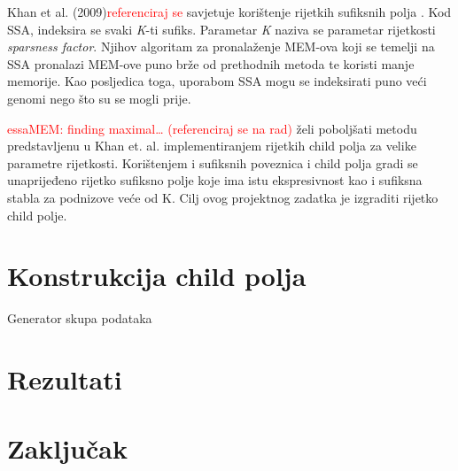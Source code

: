 \documentclass[times, utf8, seminar, numeric]{fer}
\newcommand\todo[1]{\textcolor{red}{#1}}
\begin{document}
Khan et al. (2009)\todo{referenciraj se} savjetuje korištenje rijetkih sufiksnih polja . Kod SSA, indeksira se svaki \textit{K}-ti sufiks. Parametar \textit{K} naziva se parametar rijetkosti \textit{sparsness factor}. Njihov algoritam za pronalaženje MEM-ova koji se temelji na SSA pronalazi MEM-ove puno brže od prethodnih metoda te koristi manje memorije. Kao posljedica toga, uporabom SSA mogu se indeksirati puno veći genomi nego što su se mogli prije.

\todo{essaMEM: finding maximal… (referenciraj se na rad)} želi poboljšati metodu predstavljenu u Khan et. al. implementiranjem rijetkih child polja za velike parametre rijetkosti. Korištenjem i sufiksnih poveznica  i child polja gradi se unaprijeđeno rijetko sufiksno polje  koje ima istu ekspresivnost kao i sufiksna stabla za podnizove veće od K. Cilj ovog projektnog zadatka je izgraditi rijetko child polje.

\chapter{Konstrukcija child polja}

\begin{algorithm}[h]
	\caption{Generator skupa podataka}
	\label{alg:generator}

	
\end{algorithm}

\chapter{Rezultati}

\chapter{Zaključak}




\begin{sazetak}


\end{sazetak}
\end{document}
